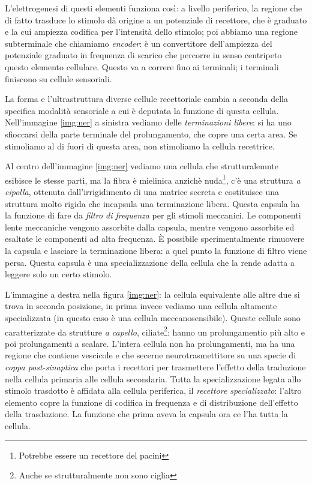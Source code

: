 \documentclass[a4paper,12pt]{article}
\begin{document}
L'elettrogenesi di questi elementi funziona così: a livello periferico, la regione che di fatto trasduce lo stimolo dà origine a un potenziale di recettore, che è graduato e la cui ampiezza codifica per l'intensità dello stimolo; poi abbiamo una regione subterminale che chiamiamo \emph{encoder}: è un convertitore dell'ampiezza del potenziale graduato in frequenza di scarico che percorre in senso centripeto questo elemento cellulare. Questo va a correre fino ai terminali; i terminali finiscono su cellule sensoriali.

La forma e l'ultrastruttura diverse cellule recettoriale cambia a seconda della specifica modalità sensoriale a cui è deputata la funzione di questa cellula. Nell'immagine \ref{img:ner} a sinistra vediamo delle \emph{terminazioni libere}: si ha uno sfioccarsi della parte terminale del prolungamento, che copre una certa area. Se stimoliamo al di fuori di questa area, non stimoliamo la cellula recettrice. 

Al centro dell'immagine \ref{img:ner} vediamo una cellula che strutturalemnte esibisce le stesse parti, ma la fibra è mielinica anzichè nuda\footnote{Potrebbe essere un recettore del pacini}, c'è una struttura \emph{a cipolla}, ottenuta dall'irrigidimento di una matrice secreta e costituisce una struttura molto rigida che incapsula una terminazione libera. Questa capsula ha la funzione di fare da \emph{filtro di frequenza} per gli stimoli meccanici. Le componenti lente meccaniche vengono assorbite dalla capsula, mentre vengono assorbite ed esaltate le componenti ad alta frequenza. È possibile sperimentalmente rimuovere la capsula e lasciare la terminazione libera: a quel punto la funzione di filtro viene persa. Questa capsula è una specializzazione della cellula che la rende adatta a leggere solo un certo stimolo.

L'immagine a destra nella figura \ref{img:ner}: la cellula equivalente alle altre due si trova in seconda posizione, in prima invece vediamo una cellula altamente specializzata (in questo caso è una cellula meccanosensibile). Queste cellule sono caratterizzate da strutture \emph{a capello}, ciliate\footnote{Anche se strutturalmente non sono ciglia}: hanno un prolungamentio più alto e poi prolungamenti a scalare. L'intera cellula non ha prolungamenti, ma ha una regione che contiene vescicole e che secerne neurotrasmettitore su una specie di \emph{coppa post-sinaptica} che porta i recettori per trasmettere l'effetto della traduzione nella cellula primaria alle cellula secondaria. Tutta la specializzazione legata allo stimolo trasdotto è affidata alla cellula periferica, il \emph{recettore specializzato}: l'altro elemento copre la funzione di codifica in frequenza e di distribuzione dell'effetto della trasduzione. La funzione che prima aveva la capsula ora ce l'ha tutta la cellula.
\end{document}
